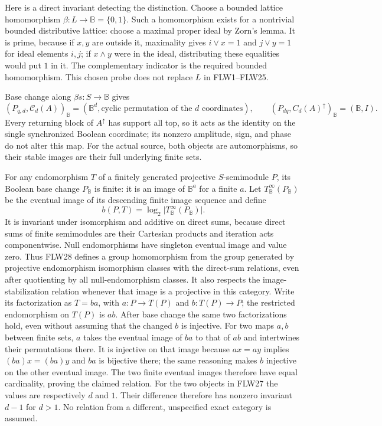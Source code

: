 Here is a direct invariant detecting the distinction. Choose a
bounded lattice homomorphism $\beta:L\to\mathbb B=\{0,1\}$.
Such a homomorphism exists for a nontrivial bounded distributive
lattice: choose a maximal proper ideal by Zorn's lemma. It is prime,
because if $x,y$ are outside it, maximality gives $i\vee x=1$
and $j\vee y=1$ for ideal elements $i,j$; if $x\wedge y$ were in
the ideal, distributing these equalities would put $1$ in it.
The complementary indicator is the required bounded homomorphism.
This chosen probe does not replace $L$ in FLW1--FLW25.

Base change along $\beta s:S\to\mathbb B$ gives
\[
 (P_{q,d},\mathcal C_d(A))_{\mathbb B}
       =(\mathbb B^d,\text{cyclic permutation of the }d\text{ coordinates}),
 \qquad
 (P_{dq},C_d(A)^\uparrow)_{\mathbb B}=(\mathbb B,I).
 \tag{FLW27}
\]
Every returning block of $A^\uparrow$ has support all top, so it
acts as the identity on the single synchronized Boolean coordinate;
its nonzero amplitude, sign, and phase do not alter this map.
For the actual source, both objects are automorphisms, so their
stable images are their full underlying finite sets.

For any endomorphism $T$ of a finitely generated projective
$S$-semimodule $P$, its Boolean base change $P_{\mathbb B}$ is
finite: it is an image of $\mathbb B^a$ for a finite $a$.
Let $T_{\mathbb B}^{\infty}(P_{\mathbb B})$ be the eventual image
of its descending finite image sequence and define
\[
 b(P,T)=\log_2\big|T_{\mathbb B}^{\infty}(P_{\mathbb B})\big|.
 \tag{FLW28}
\]
It is invariant under isomorphism and additive on direct sums,
because direct sums of finite semimodules are their Cartesian
products and iteration acts componentwise. Null endomorphisms
have singleton eventual image and value zero. Thus FLW28 defines
a group homomorphism from the group generated by projective
endomorphism isomorphism classes with the direct-sum relations,
even after quotienting by all null-endomorphism classes. It also
respects the image-stabilization relation whenever that image is
a projective in this category. Write its factorization as
$T=ba$, with $a:P\to T(P)$ and $b:T(P)\to P$; the restricted
endomorphism on $T(P)$ is $ab$. After base change the same two
factorizations hold, even without assuming that the changed $b$
is injective. For two maps $a,b$ between finite sets, $a$ takes
the eventual image of $ba$ to that of $ab$ and intertwines their
permutations there. It is injective on that image because
$ax=ay$ implies $(ba)x=(ba)y$ and $ba$ is bijective there;
the same reasoning makes $b$ injective on the other eventual
image. The two finite eventual images therefore have equal
cardinality, proving the claimed relation.
For the two objects in FLW27 the values are respectively $d$ and $1$.
Their difference therefore has nonzero invariant $d-1$ for $d>1$.
No relation from a different, unspecified exact category is assumed.

